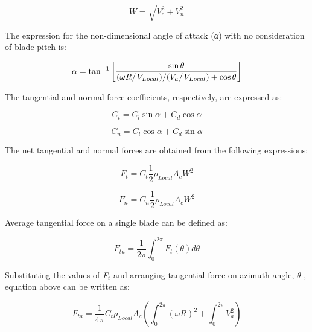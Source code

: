 \begin{equation}
W = \sqrt {V_c^2 + V_n^2}
\end{equation}

The expression for the non-dimensional angle of attack (\emph{α}) with no consideration of blade pitch is:

\begin{equation}
\alpha  = {\tan ^{ - 1}}\left[ {\frac{{\sin \theta }}{{{{(\omega R} \mathord{\left/ {\vphantom {{(\omega R} {{V_{Local}})/({{{V_a}} \mathord{\left/ {\vphantom {{{V_a}} {{V_{Local}}}}} \right. } {{V_{Local}}}}}}} \right. } {{V_{Local}})/({{{V_a}} \mathord{\left/ {\vphantom {{{V_a}} {{V_{Local}}}}} \right. } {{V_{Local}}}}}}) + \cos \theta }}} \right]
\end{equation}

The tangential and normal force coefficients, respectively, are expressed as:

\begin{equation}
{C_t} = {C_l}\sin \alpha  + {C_d}\cos \alpha
\end{equation}

\begin{equation}
{C_n} = {C_l}\cos \alpha  + {C_d}\sin \alpha
\end{equation}

The net tangential and normal forces are obtained from the following expressions:

\begin{equation}
{F_t} = {C_t}\frac{1}{2}{\rho_{Local}}{A_c}{W^2}
\end{equation}

\begin{equation}
{F_n} = {C_n}\frac{1}{2}{\rho_{Local}}{A_c}{W^2}
\end{equation}

Average tangential force on a single blade can be defined as:

\begin{equation}
{F_{ta}} = \frac{1}{{2\pi }}\int_0^{2\pi } {{F_t}(\theta )d\theta }
\end{equation}

Substituting the values of \emph{F\(_{t}\)} and arranging tangential force on azimuth angle, \(\theta\) , equation above can be written as:

\begin{equation}
{F_{ta}} = \frac{1}{{4\pi }}{C_t}{\rho_{Local}}{A_c}(\int_0^{2\pi } {{{(\omega R)}^2}}  + \int_0^{2\pi } {V_a^2} )
\end{equation}

